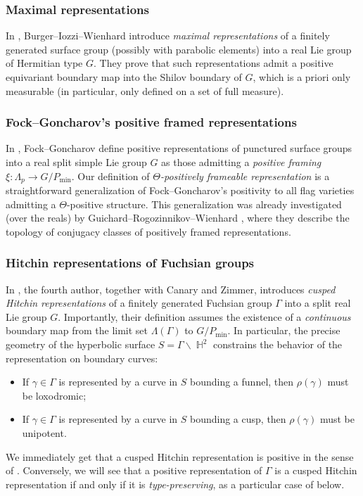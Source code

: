 \documentclass{amsart}
\theoremstyle{plain}
\theoremstyle{definition}
\DeclareMathOperator{\Hb}{\mathbb{H}}
\newcommand{\1}{\mathbf{1}}
\begin{document}
\subsubsection*{Maximal representations}
In \cite{BIW03,BIW10}, Burger--Iozzi--Wienhard introduce \emph{maximal representations} of a finitely generated surface group (possibly with parabolic elements) into a real Lie group of Hermitian type $G$. They prove that such representations admit a positive equivariant boundary map into the Shilov boundary of $G$, which is a priori only measurable (in particular, only defined on a set of full measure).

\subsubsection*{Fock--Goncharov's positive framed representations}
In \cite{fock2006moduli}, Fock--Goncharov define positive representations of punctured surface groups into a real split simple Lie group $G$ as those admitting a \emph{positive framing} $\xi: \Lambda_p \to G/P_{\textrm{min}}$. Our definition of \emph{$\Theta$-positively frameable representation} is a straightforward generalization of Fock--Goncharov's positivity to all flag varieties admitting a $\Theta$-positive structure. This generalization was already investigated (over the reals) by Guichard--Rogozinnikov--Wienhard \cite{GRW}, where they describe the topology of conjugacy classes of positively framed representations.


\subsubsection*{Hitchin representations of Fuchsian groups}
In \cite{CZZ}, the fourth author, together with Canary and Zimmer, introduces \emph{cusped Hitchin representations} of a finitely generated Fuchsian group $\Gamma$ into a split real Lie group $G$. Importantly, their definition assumes the existence of a \emph{continuous} boundary map from the limit set $\Lambda(\Gamma)$ to $G/P_{\textrm{min}}$. In particular, the precise geometry of the hyperbolic surface $ S=\Gamma \backslash \Hb^2$ constrains the behavior of the representation on boundary curves:
\begin{itemize}
    \item If $\gamma\in \Gamma$ is represented by a curve in $S$ bounding a funnel, then $\rho(\gamma)$ must be loxodromic;
    \item If $\gamma \in \Gamma$ is represented by a curve in $S$ bounding a cusp, then $\rho(\gamma)$ must be unipotent.
\end{itemize}
We immediately get that a cusped Hitchin representation is positive in the sense of .
Conversely, we will see that a positive representation of $\Gamma$ is a cusped Hitchin representation if and only if it is \emph{type-preserving}, as a particular case of  below.
\end{document}
